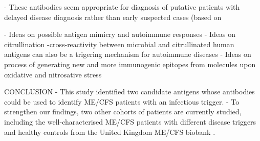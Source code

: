     - These antibodies seem appropriate for diagnosis of putative patients with delayed disease diagnosis rather than early suspected cases (based on \citet{luisnacul2020HowMyalgic}

- Ideas on possible antigen mimicry and autoimmune responses
- Ideas on citrullination
        -cross-reactivity between microbial and citrullinated human antigens can also be a trigering mechanism for autoimmune diseases
- Ideas on process of generating new and more immunogenic epitopes from molecules upon oxidative and nitrosative stress

CONCLUSION
- This study identified two candidate antigens whose antibodies could be used to identify ME/CFS patients with an infectious trigger.
- To strengthen our findings, two other cohorts of patients are currently studied, including the well-characterised ME/CFS patients with different disease triggers and healthy controls from the United Kingdom ME/CFS biobank \citep{domingues2021HerpesvirusesSerologya}.
    